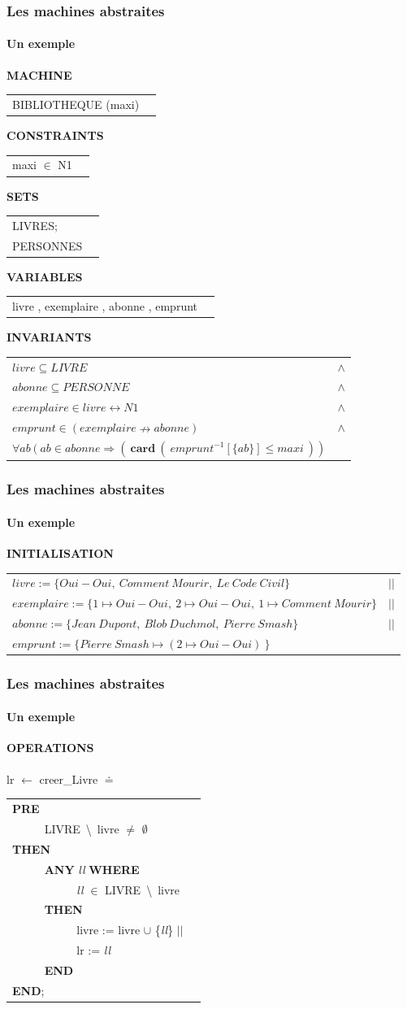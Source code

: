 \documentclass[11pt,a4paper,xcolor=table]{beamer} %
\begin{document}
\begin{frame}
\frametitle{Les machines abstraites}
\framesubtitle{Un exemple}
\setlength{\LTpre}{\medskipamount}
\setlength{\LTpost}{0pt}
\setlength\LTleft{\parindent}
\textbf{MACHINE}
\begin{longtable}{ll} BIBLIOTHEQUE (maxi) \end{longtable}
\noindent\textbf{CONSTRAINTS}
\begin{longtable}{ll} maxi $\in$ N1 \end{longtable}
\noindent\textbf{SETS}
\begin{longtable}{ll} LIVRES; \\ PERSONNES\\ \end{longtable}
\noindent\textbf{VARIABLES}
\begin{longtable}{ll} livre , exemplaire , abonne , emprunt \end{longtable}
\noindent\textbf{INVARIANTS}
\begin{longtable}{ll}
$livre \subseteq LIVRE $ & $\wedge$ \tabularnewline
$abonne \subseteq PERSONNE$ & $\wedge$ \tabularnewline
$exemplaire \in livre \leftrightarrow N1$ & $\wedge$ \tabularnewline
$emprunt \in ( exemplaire \nrightarrow abonne )$ & $\wedge$ \tabularnewline
$\forall ab\ (\ ab \in abonne \Rightarrow (\ \textbf{card}\ (\ emprunt ^{-1}[\{ab\}] \leq maxi\ ))$ &
\end{longtable}
\end{frame}

\begin{frame}
\frametitle{Les machines abstraites}
\framesubtitle{Un exemple}
\noindent\textbf{INITIALISATION}
\begin{longtable}{ll}
$livre := \{Oui-Oui,\ Comment\ Mourir,\ Le\ Code\ Civil\} $& $||$ \tabularnewline
$exemplaire := \{1 \mapsto Oui-Oui,\ 2 \mapsto Oui-Oui,\ 1 \mapsto Comment\ Mourir\}$ & $||$ \tabularnewline
$abonne := \{Jean\ Dupont,\ Blob\ Duchmol,\ Pierre\ Smash\} $& $||$ \tabularnewline
$emprunt := \{Pierre\ Smash \mapsto ( 2 \mapsto Oui-Oui)\ \}$ &
\end{longtable}
\end{frame}

\begin{frame}
\frametitle{Les machines abstraites}
\framesubtitle{Un exemple}
\noindent \textbf{OPERATIONS}\\~\\
\indent lr $\leftarrow$ creer\_Livre $\doteq$
\begin{longtable}{ll}\textbf{PRE} \tabularnewline
~~~~~ LIVRE\ \textbackslash \ livre $\neq$ $\emptyset$ \tabularnewline
\textbf{THEN} \tabularnewline
~~~~~ \textbf{ANY} \emph{ll} \textbf{WHERE} \tabularnewline ~~~~~ ~~~~~ \emph{ll} $\in$ LIVRE\ \textbackslash \ livre \tabularnewline
~~~~~ \textbf{THEN} \tabularnewline
~~~~~ ~~~~~ livre := livre $\cup$ \{\emph{ll}\} $||$ \tabularnewline
~~~~~ ~~~~~ lr := \emph{ll} \tabularnewline
~~~~~ \textbf{END} \tabularnewline
\textbf{END};
\end{longtable}
\end{frame}
\end{document}

